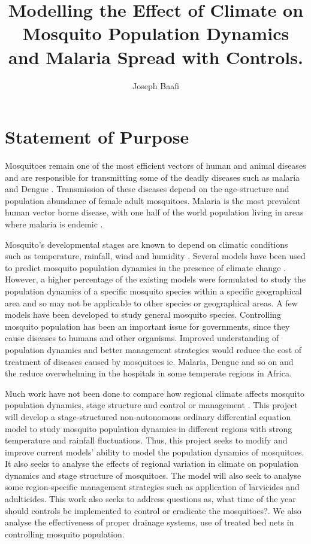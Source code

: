 \documentclass[12pt,a4paper,titlepage]{article}
\author{Joseph Baafi}
\title{Modelling the Effect of Climate on Mosquito Population Dynamics and Malaria Spread with Controls.}
\begin{document}
\maketitle
\tableofcontents
\newpage
\section{Statement of Purpose} 

Mosquitoes remain one of the most efficient vectors of human and animal diseases and are responsible for transmitting some of the deadly diseases such as malaria and Dengue \cite{beck2013effect, abdelrazec2017mathematical, hamdan2020effect, abiodun2016modelling}. Transmission of these diseases depend on the age-structure and population abundance of female adult mosquitoes.  Malaria is the most prevalent human vector borne disease, with one half of the world population living in areas where malaria is endemic \cite{WikBlack5}.

 Mosquito’s developmental stages are known to depend on climatic conditions such as temperature, rainfall, wind and humidity \cite{agusto2015qualitative, mordecai2013optimal, abdelrazec2017mathematical}. Several models have been used to predict mosquito population dynamics in the presence of climate change \cite{beck2013effect, abdelrazec2017mathematical, hamdan2020effect}. However, a higher percentage of the existing models were formulated to study the population dynamics of a specific mosquito species within a specific geographical area \cite{agusto2015qualitative, mordecai2013optimal, abiodun2016modelling, abdelrazec2017mathematical} and so may not be applicable to other species or geographical areas. A few models have been developed to study general mosquito species. Controlling mosquito population has been an important issue for governments, since they cause diseases to humans and other organisms. Improved understanding of population dynamics and better management strategies would reduce the cost of treatment of diseases caused by mosquitoes ie. Malaria, Dengue and so on and  the reduce overwhelming in the hospitals in some temperate regions in Africa.  

Much work have not been done to compare how regional climate affects mosquito population dynamics, stage structure and control or management \cite{hurford2019regional}.
This project will develop a stage-structured non-autonomous ordinary differential equation model to study mosquito population dynamics in different regions with strong temperature and rainfall fluctuations.
Thus, this project seeks to modify and improve current models’ ability to model the population dynamics of mosquitoes. It also seeks to analyse the effects of regional variation in climate on population dynamics and stage structure of mosquitoes. The model will also seek to analyse some region-specific management strategies such as application of larvicides and adulticides. This work also seeks to address questions as, what time of the year should controls be implemented to control or eradicate the mosquitoes?. We also analyse the effectiveness of proper drainage systems, use of treated bed nets in controlling mosquito population.
\end{document}
